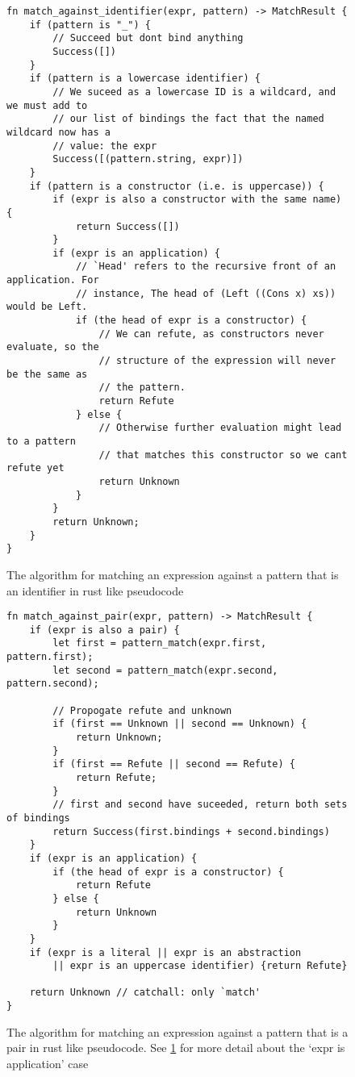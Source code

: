 \begin{figure}[h]
    \begin{lstlisting}[language=Rust_boxed]
fn match_against_identifier(expr, pattern) -> MatchResult {
    if (pattern is "_") {
        // Succeed but dont bind anything
        Success([])
    }
    if (pattern is a lowercase identifier) {
        // We suceed as a lowercase ID is a wildcard, and we must add to 
        // our list of bindings the fact that the named wildcard now has a 
        // value: the expr
        Success([(pattern.string, expr)])
    }
    if (pattern is a constructor (i.e. is uppercase)) {
        if (expr is also a constructor with the same name) {
            return Success([])
        }
        if (expr is an application) {
            // `Head' refers to the recursive front of an application. For 
            // instance, The head of (Left ((Cons x) xs)) would be Left.
            if (the head of expr is a constructor) {
                // We can refute, as constructors never evaluate, so the 
                // structure of the expression will never be the same as
                // the pattern. 
                return Refute
            } else {
                // Otherwise further evaluation might lead to a pattern 
                // that matches this constructor so we cant refute yet
                return Unknown
            }
        }
        return Unknown;
    }
}
    \end{lstlisting}
    \caption{The algorithm for matching an expression against a pattern that is an identifier in rust like pseudocode}
    \label{fig:pattern_list_id}
\end{figure}

\begin{figure}[h]
    \begin{lstlisting}[language=Rust_boxed]
fn match_against_pair(expr, pattern) -> MatchResult {
    if (expr is also a pair) {
        let first = pattern_match(expr.first, pattern.first);
        let second = pattern_match(expr.second, pattern.second);

        // Propogate refute and unknown
        if (first == Unknown || second == Unknown) {
            return Unknown;
        }
        if (first == Refute || second == Refute) {
            return Refute;
        }
        // first and second have suceeded, return both sets of bindings
        return Success(first.bindings + second.bindings)
    }
    if (expr is an application) {
        if (the head of expr is a constructor) {
            return Refute
        } else {
            return Unknown
        }
    }
    if (expr is a literal || expr is an abstraction 
        || expr is an uppercase identifier) {return Refute}
    
    return Unknown // catchall: only `match'
}
\end{lstlisting}
    \caption{The algorithm for matching an expression against a pattern that is a pair in rust like pseudocode. See \ref{fig:pattern_list_id} for more detail about the `expr is application' case}
    \label{fig:pattern_list_pair}
\end{figure}

